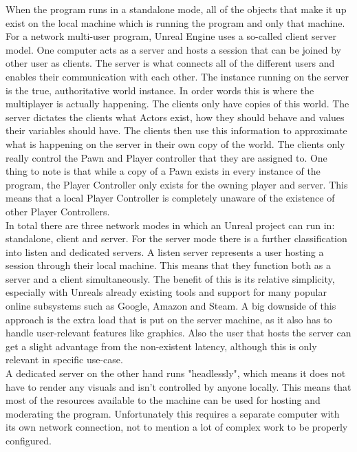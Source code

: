 When the program runs in a standalone mode, all of the objects that make it up exist on the local machine which is running the program and only that machine. For a network multi-user program, Unreal Engine uses a so-called client server model. One computer acts as a server and hosts a session that can be joined by other user as clients. The server is what connects all of the different users and enables their communication with each other. The instance running on the server is the true, authoritative world instance. In order words this is where the multiplayer is actually happening. The clients only have copies of this world. The server dictates the clients what Actors exist, how they should behave and values their variables should have. The clients then use this information to approximate what is happening on the server in their own copy of the world. The clients only really control the Pawn and Player controller that they are assigned to. One thing to note is that while a copy of a Pawn exists in every instance of the program, the Player Controller only exists for the owning player and server. This means that a local Player Controller is completely unaware of the existence of other Player Controllers.\\

In total there are three network modes in which an Unreal project can run in: standalone, client and server. For the server mode there is a further classification into listen and dedicated servers. A listen server represents a user hosting a session through their local machine. This means that they function both as a server and a client simultaneously. The benefit of this is its relative simplicity, especially with Unreals already existing tools and support for many popular online subsystems such as Google, Amazon and Steam. A big downside of this approach is the extra load that is put on the server machine, as it also has to handle user-relevant features like graphics. Also the user that hosts the server can get a slight advantage from the non-existent latency, although this is only relevant in specific use-case.\\
A dedicated server on the other hand runs "headlessly", which means it does not have to render any visuals and isn't controlled by anyone locally. This means that most of the resources available to the machine can be used for hosting and moderating the program. Unfortunately this requires a separate computer with its own network connection, not to mention a lot of complex work to be properly configured.\\

